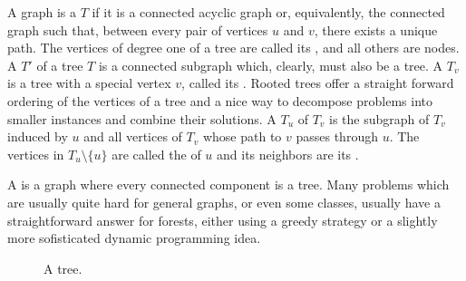 A graph is a  $T$ if it is a connected acyclic graph or, equivalently, the connected graph such that, between every pair of vertices $u$ and $v$, there exists a unique path.
The vertices of degree one of a tree are called its , and all others are  nodes. A  $T'$ of a tree $T$ is a connected subgraph which, clearly, must also be a tree.
A  $T_v$ is a tree with a special vertex $v$, called its .
Rooted trees offer a straight forward ordering of the vertices of a tree and a nice way to decompose problems into smaller instances and combine their solutions.
A  $T_u$ of $T_v$ is the subgraph of $T_v$ induced by $u$ and all vertices of $T_v$ whose path to $v$ passes through $u$.
The vertices in $T_u \setminus \{u\}$ are called the  of $u$ and its neighbors are its .

A  is a graph where every connected component is a tree.
Many problems which are usually quite hard for general graphs, or even some classes, usually have a straightforward answer for forests, either using a greedy strategy or a slightly more sofisticated dynamic programming idea.

\begin{figure}
    \centering
    \caption{A tree.}
    \label{fig:some_tree}
\end{figure}


